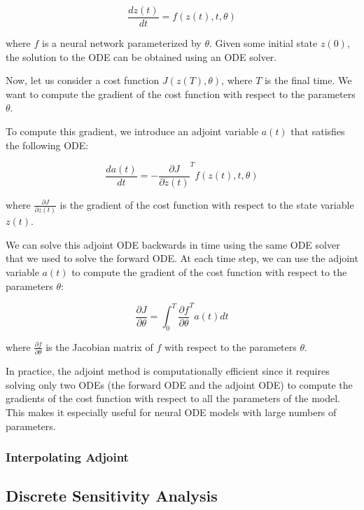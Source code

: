 \begin{equation}
  \frac{dz(t)}{dt} = f(z(t), t, \theta)
\end{equation}

where $f$ is a neural network parameterized by $\theta$. Given some initial state $z(0)$, the solution to the ODE can be obtained using an ODE solver.

Now, let us consider a cost function $J(z(T), \theta)$, where $T$ is the final time. We want to compute the gradient of the cost function with respect to the parameters $\theta$.

To compute this gradient, we introduce an adjoint variable $a(t)$ that satisfies the following ODE:

\begin{equation}
  \frac{da(t)}{dt} = -\frac{\partial J}{\partial z(t)}^T f(z(t), t, \theta)
\end{equation}

where $\frac{\partial J}{\partial z(t)}$ is the gradient of the cost function with respect to the state variable $z(t)$.

We can solve this adjoint ODE backwards in time using the same ODE solver that we used to solve the forward ODE. At each time step, we can use the adjoint variable $a(t)$ to compute the gradient of the cost function with respect to the parameters $\theta$:

\begin{equation}
  \frac{\partial J}{\partial \theta} = \int_0^T \frac{\partial f}{\partial \theta}^T a(t) dt
\end{equation}

where $\frac{\partial f}{\partial \theta}$ is the Jacobian matrix of $f$ with respect to the parameters $\theta$.

In practice, the adjoint method is computationally efficient since it requires solving only two ODEs (the forward ODE and the adjoint ODE) to compute the gradients of the cost function with respect to all the parameters of the model. This makes it especially useful for neural ODE models with large numbers of parameters.

\subsubsection{Interpolating Adjoint}
\label{subsubsec:interpolating_adjoint}

\subsection{Discrete Sensitivity Analysis}
\label{subsec:discrete_sensitivity_analysis_odes}


